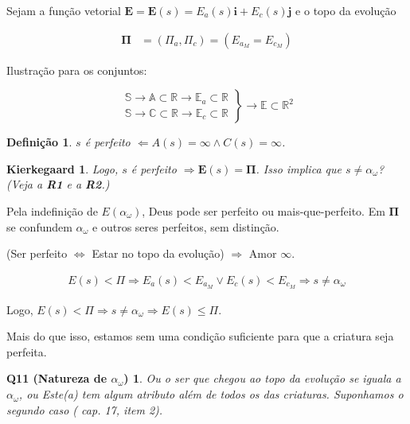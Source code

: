 \documentclass[12pt,a4paper]{article}
\begin{document}
			Sejam a fun\c{c}\~ao vetorial $ \mathbf{E} = \mathbf{E} (s) = E_a(s) \mathbf{i} + E_c(s) \mathbf{j} $ e o topo da evolu\c{c}\~ao

			\begin{align}
				\mathbf{\Pi} &= \left(\Pi_a, \Pi_c\right) = \left(E_{a_M} = E_{c_M}\right)
			\end{align}

			Ilustra\c{c}\~ao para os conjuntos:

			\begin{equation*}
				\left.\begin{aligned}
					\mathbb{S} \rightarrow \mathbb{A} \subset \mathbb{R} \rightarrow \mathbb{E}_a \subset \mathbb{R} \\
					\mathbb{S} \rightarrow \mathbb{C} \subset \mathbb{R} \rightarrow \mathbb{E}_c \subset \mathbb{R}
				\end{aligned}
				\right\}
				\rightarrow \mathbb{E} \subset \mathbb{R}^2
			\end{equation*}

			\newtheorem{D1}{Defini\c{c}\~ao}
			\begin{D1} $s$ \'e perfeito $ \Leftarrow A(s) = \infty \wedge C(s) = \infty $.
			\end{D1}

			\newtheorem{K}{Kierkegaard \cite{kierk}}
			\begin{K}
				Logo, $s$ \'e perfeito $ \Rightarrow \mathbf{E}(s) = \mathbf{\Pi} $. Isso implica que $ s \neq \alpha_\omega $? (Veja a \textbf{R1} e a \textbf{R2}.)
			\end{K}

			Pela indefini\c{c}\~ao de $E(\alpha_\omega)$, Deus pode ser perfeito ou mais-que-perfeito. Em $\mathbf{\Pi}$ se confundem $\alpha_\omega$ e outros seres perfeitos, sem distin\c{c}\~ao.

			(Ser perfeito $ \Leftrightarrow $ Estar no topo da evolu\c{c}\~ao) $ \Rightarrow $ Amor $ \infty $.

			\begin{align*}
			    E(s) < \Pi \Rightarrow E_a(s) < E_{a_M} \vee  E_c(s) < E_{c_M} \Rightarrow s \neq \alpha_\omega
			\end{align*}

			Logo, $ E(s) < \Pi \Rightarrow s \neq \alpha_\omega \Rightarrow E(s) \le \Pi $.

			Mais do que isso, estamos sem uma condi\c{c}\~ao suficiente para que a criatura seja perfeita.

			\newtheorem{Q11}{Q11 (Natureza de $\alpha_\omega$)}
			\begin{Q11} Ou o ser que chegou ao topo da evolu\c{c}\~ao se iguala a $ \alpha_\omega $, ou Este(a) \cite{generoDeus} tem algum atributo al\'em de todos os das criaturas. Suponhamos o segundo caso (\cite{ese} cap. 17, item 2).
			\end{Q11}
\end{document}
